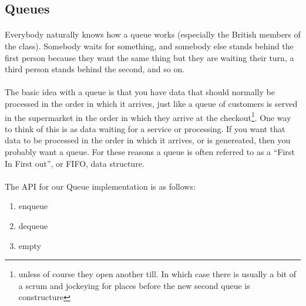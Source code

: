 \documentclass[10pt, a4paper, twosize]{article}
\begin{document}
\subsection{Queues}

\paragraph{} Everybody naturally knows how a queue works (especially the British members of the class). Somebody waits for something, and somebody else stands behind the first person because they want the same thing but they are waiting their turn, a third person stands behind the second, and so on.

\paragraph{} The basic idea with a queue is that you have data that should normally be processed in the order in which it arrives, just like a queue of customers is served in the supermarket in the order in which they arrive at the checkout\footnote{unless of course they open another till. In which case there is usually a bit of a scrum and jockeying for places before the new second queue is constructure}. One way to think of this is as data waiting for a service or processing. If you want that data to be processed in the order in which it arrives, or is genereated, then you probably want a queue. For these reasons a queue is often referred to as a ``First In First out'', or FIFO, data structure.

\paragraph{} The API for our Queue implementation is as follows:

\begin{enumerate}
\item enqueue
\item dequeue
\item empty
\end{enumerate}
\end{document}
